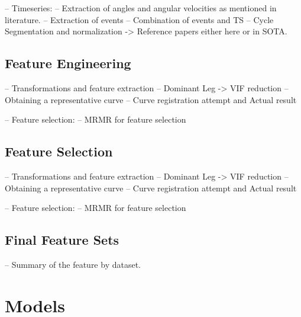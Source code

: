 -- Timeseries:
    -- Extraction of angles and angular velocities as mentioned in literature.
    -- Extraction of events
    -- Combination of events and TS
    -- Cycle Segmentation and normalization -> Reference papers either here or in SOTA.

\subsection{Feature Engineering}\label{subsec:method-feature-engineering}
-- Transformations and feature extraction
    -- Dominant Leg -> VIF reduction
    -- Obtaining a representative curve
        -- Curve registration attempt and Actual result

-- Feature selection:
    -- MRMR for feature selection

\subsection{Feature Selection}\label{subsec:method-feature-selection}
-- Transformations and feature extraction
    -- Dominant Leg -> VIF reduction
    -- Obtaining a representative curve
        -- Curve registration attempt and Actual result

-- Feature selection:
    -- MRMR for feature selection



\subsection{Final Feature Sets}\label{subsec:method-final-feature-sets}
-- Summary of the feature by dataset.

\section{Models}\label{sec:method-models}

